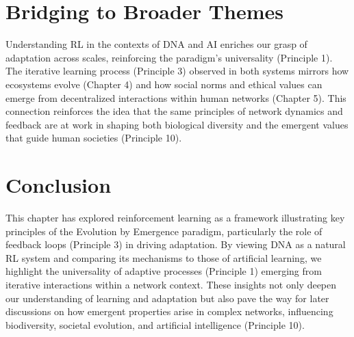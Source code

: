 \section{Bridging to Broader Themes}
Understanding RL in the contexts of DNA and AI enriches our grasp of adaptation across scales, reinforcing the paradigm's universality (Principle 1). The iterative learning process (Principle 3) observed in both systems mirrors how ecosystems evolve (Chapter 4) and how social norms and ethical values can emerge from decentralized interactions within human networks (Chapter 5). This connection reinforces the idea that the same principles of network dynamics and feedback are at work in shaping both biological diversity and the emergent values that guide human societies (Principle 10). %

\section*{Conclusion}
This chapter has explored reinforcement learning as a framework illustrating key principles of the Evolution by Emergence paradigm, particularly the role of feedback loops (Principle 3) in driving adaptation. By viewing DNA as a natural RL system and comparing its mechanisms to those of artificial learning, we highlight the universality of adaptive processes (Principle 1) emerging from iterative interactions within a network context. These insights not only deepen our understanding of learning and adaptation but also pave the way for later discussions on how emergent properties arise in complex networks, influencing biodiversity, societal evolution, and artificial intelligence (Principle 10). %
\cleardoublepage